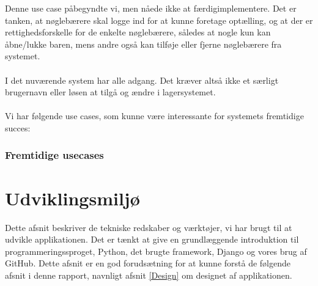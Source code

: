 \documentclass[]{article}
\begin{document}
Denne use case påbegyndte vi, men nåede ikke at færdigimplementere. Det er tanken, at nøglebærere skal logge ind for at kunne foretage optælling, og at der er rettighedsforskelle for de enkelte nøglebærere, således at nogle kun kan åbne/lukke baren, mens andre også kan tilføje eller fjerne nøglebærere fra systemet. \\ \\
I det nuværende system har alle adgang. Det kræver altså ikke et særligt brugernavn eller løsen at tilgå og ændre i lagersystemet. \\ \\
Vi har følgende use cases, som kunne være interessante for systemets fremtidige succes:
\subsubsection*{Fremtidige usecases}
  \vspace*{0.5cm}

\pagebreak[3]

\section{Udviklingsmiljø} \label{Udviklingsmiljo}
Dette afsnit beskriver de tekniske redskaber og værktøjer, vi har brugt til at udvikle applikationen. Det er tænkt at give en grundlæggende introduktion til programmeringssproget, Python, det brugte framework, Django og vores brug af GitHub. Dette afsnit er en god forudsætning for at kunne forstå de følgende afsnit i denne rapport, navnligt afsnit \ref{Design} om designet af applikationen. 
\end{document}
